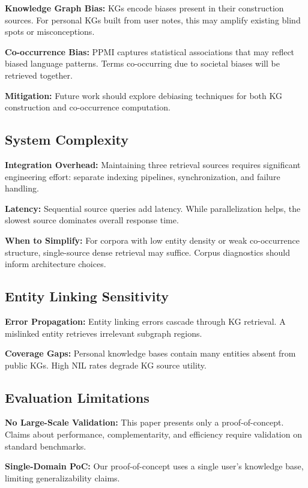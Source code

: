 \documentclass[11pt,a4paper]{article}
\begin{document}
\textbf{Knowledge Graph Bias:} KGs encode biases present in their construction sources. For personal KGs built from user notes, this may amplify existing blind spots or misconceptions.

\textbf{Co-occurrence Bias:} PPMI captures statistical associations that may reflect biased language patterns. Terms co-occurring due to societal biases will be retrieved together.

\textbf{Mitigation:} Future work should explore debiasing techniques for both KG construction and co-occurrence computation.

\subsection{System Complexity}

\textbf{Integration Overhead:} Maintaining three retrieval sources requires significant engineering effort: separate indexing pipelines, synchronization, and failure handling.

\textbf{Latency:} Sequential source queries add latency. While parallelization helps, the slowest source dominates overall response time.

\textbf{When to Simplify:} For corpora with low entity density or weak co-occurrence structure, single-source dense retrieval may suffice. Corpus diagnostics should inform architecture choices.

\subsection{Entity Linking Sensitivity}

\textbf{Error Propagation:} Entity linking errors cascade through KG retrieval. A mislinked entity retrieves irrelevant subgraph regions.

\textbf{Coverage Gaps:} Personal knowledge bases contain many entities absent from public KGs. High NIL rates degrade KG source utility.

\subsection{Evaluation Limitations}

\textbf{No Large-Scale Validation:} This paper presents only a proof-of-concept. Claims about performance, complementarity, and efficiency require validation on standard benchmarks.

\textbf{Single-Domain PoC:} Our proof-of-concept uses a single user's knowledge base, limiting generalizability claims.
\end{document}
